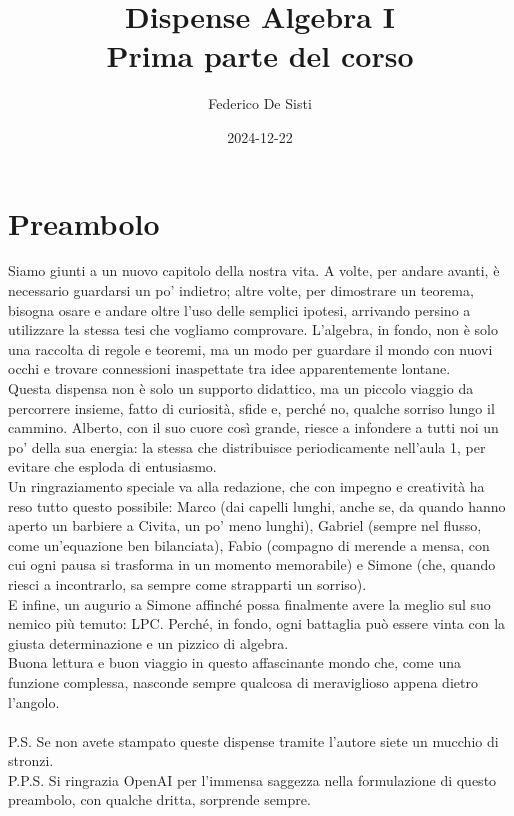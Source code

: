 \documentclass[12px]{article}
\title{Dispense Algebra I\\[5px] \normalsize Prima parte del corso}
\date{2024-12-22}
\author{Federico De Sisti}
\begin{document}
	\maketitle
	\newpage

	\tableofcontents
	\newpage


	\section{Preambolo}
	Siamo giunti a un nuovo capitolo della nostra vita. A volte, per andare avanti, è necessario guardarsi un po' indietro; altre volte, per dimostrare un teorema, bisogna osare e andare oltre l'uso delle semplici ipotesi, arrivando persino a utilizzare la stessa tesi che vogliamo comprovare. L'algebra, in fondo, non è solo una raccolta di regole e teoremi, ma un modo per guardare il mondo con nuovi occhi e trovare connessioni inaspettate tra idee apparentemente lontane.\\[10px]
	Questa dispensa non è solo un supporto didattico, ma un piccolo viaggio da percorrere insieme, fatto di curiosità, sfide e, perché no, qualche sorriso lungo il cammino. Alberto, con il suo cuore così grande, riesce a infondere a tutti noi un po' della sua energia: la stessa che distribuisce periodicamente nell’aula 1, per evitare che esploda di entusiasmo.\\[10px]
	Un ringraziamento speciale va alla redazione, che con impegno e creatività ha reso tutto questo possibile: Marco (dai capelli lunghi, anche se, da quando hanno aperto un barbiere a Civita, un po' meno lunghi), Gabriel (sempre nel flusso, come un’equazione ben bilanciata), Fabio (compagno di merende a mensa, con cui ogni pausa si trasforma in un momento memorabile) e Simone (che, quando riesci a incontrarlo, sa sempre come strapparti un sorriso).\\[10px]
	E infine, un augurio a Simone affinché possa finalmente avere la meglio sul suo nemico più temuto: LPC. Perché, in fondo, ogni battaglia può essere vinta con la giusta determinazione e un pizzico di algebra.\\[10px]
Buona lettura e buon viaggio in questo affascinante mondo che, come una funzione complessa, nasconde sempre qualcosa di meraviglioso appena dietro l’angolo.\ \\ \vfill \ \\
	P.S. Se non avete stampato queste dispense tramite l'autore siete un mucchio di stronzi.\\
	P.P.S. Si ringrazia OpenAI per l'immensa saggezza nella formulazione di questo preambolo, con qualche dritta, sorprende sempre.
\newpage
\end{document}
